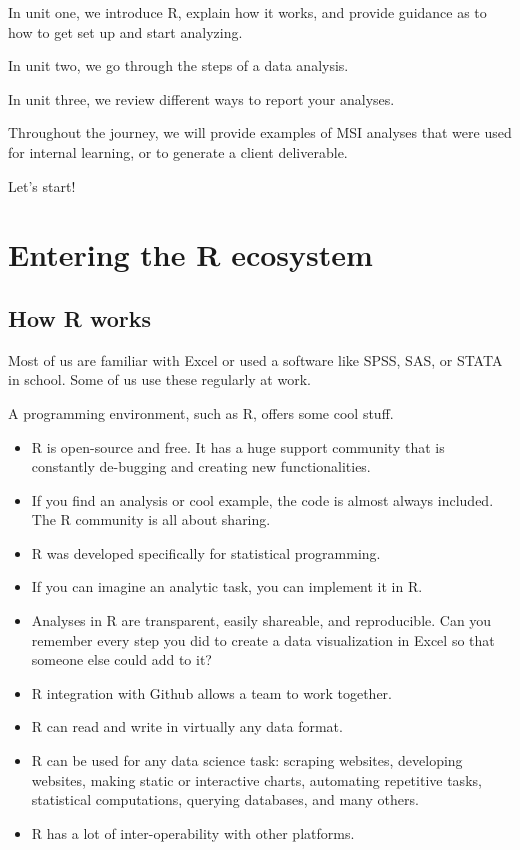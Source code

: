 \documentclass[
  letterpaper,
  DIV=11,
  numbers=noendperiod]{scrreprt}
\begin{document}
In unit one, we introduce R, explain how it works, and provide guidance
as to how to get set up and start analyzing.

In unit two, we go through the steps of a data analysis.

In unit three, we review different ways to report your analyses.

Throughout the journey, we will provide examples of MSI analyses that
were used for internal learning, or to generate a client deliverable.

Let's start!

\part{Entering the R ecosystem}

\chapter{How R works}\label{how-r-works}

Most of us are familiar with Excel or used a software like SPSS, SAS, or
STATA in school. Some of us use these regularly at work.

A programming environment, such as R, offers some cool stuff.

\begin{itemize}
\item
  R is open-source and free. It has a huge support community that is
  constantly de-bugging and creating new functionalities.
\item
  If you find an analysis or cool example, the code is almost always
  included. The R community is all about sharing.
\item
  R was developed specifically for statistical programming.
\item
  If you can imagine an analytic task, you can implement it in R.
\item
  Analyses in R are transparent, easily shareable, and reproducible. Can
  you remember every step you did to create a data visualization in
  Excel so that someone else could add to it?
\item
  R integration with Github allows a team to work together.
\item
  R can read and write in virtually any data format.
\item
  R can be used for any data science task: scraping websites, developing
  websites, making static or interactive charts, automating repetitive
  tasks, statistical computations, querying databases, and many others.
\item
  R has a lot of inter-operability with other platforms.
\end{itemize}
\end{document}
